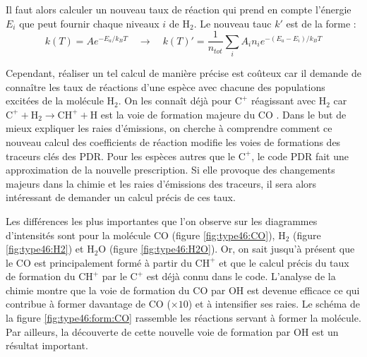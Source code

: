 Il faut alors calculer un nouveau taux de réaction qui prend en compte l'énergie $E_i$ que peut fournir chaque niveaux $i$ de $\mathrm{H}_2$. Le nouveau tauc $k'$ est de la forme :
\begin{equation}
    k(T) = A e^{- E_a / k_BT} \quad \rightarrow \quad  k(T)' =  \frac{1}{n_{tot}} \sum_i A_i n_i e^{- (E_a - E_i) / k_BT}
\end{equation}

Cependant, réaliser un tel calcul de manière précise est coûteux car il demande de connaître les taux de réactions d'une espèce avec chacune des populations excitées de la molécule $\mathrm{H}_2$. On les connaît déjà pour $\mathrm{C}^+$ réagissant avec $\mathrm{H}_2$ car $\mathrm{C}^+ + \mathrm{H}_2 \rightarrow \mathrm{CH}^+ + \mathrm{H}$ est la voie de formation majeure du $\mathrm{CO}$ \cite{COJoblin}. Dans le but de mieux expliquer les raies d'émissions, on cherche à comprendre comment ce nouveau calcul des coefficients de réaction modifie les voies de formations des traceurs clés des PDR. Pour les espèces autres que le $\mathrm{C}^+$, le code PDR fait une approximation de la nouvelle prescription. Si elle provoque des changements majeurs dans la chimie et les raies d'émissions des traceurs, il sera alors intéressant de demander un calcul précis de ces taux. \newline 

Les différences les plus importantes que l'on observe sur les diagrammes d'intensités sont pour la molécule $\mathrm{CO}$ (figure \ref{fig:type46:CO}), $\mathrm{H}_2$ (figure \ref{fig:type46:H2}) et $\mathrm{H}_2\mathrm{O}$ (figure \ref{fig:type46:H2O}). Or, on sait jusqu'à présent que le $\mathrm{CO}$ est principalement formé à partir du $\mathrm{CH}^+$ et que le calcul précis du taux de formation du $\mathrm{CH}^+$ par le $\mathrm{C}^+$ est déjà connu dans le code. L'analyse de la chimie montre que la voie de formation du $\mathrm{CO}$ par $\mathrm{OH}$ est devenue efficace ce qui contribue à former davantage de $\mathrm{CO}$ ($\times 10$) et à intensifier ses raies. Le schéma de la figure \ref{fig:type46:form:CO} rassemble les réactions servant à former la molécule. Par ailleurs, la découverte de cette nouvelle voie de formation par $\mathrm{OH}$ est un résultat important. \newline 

